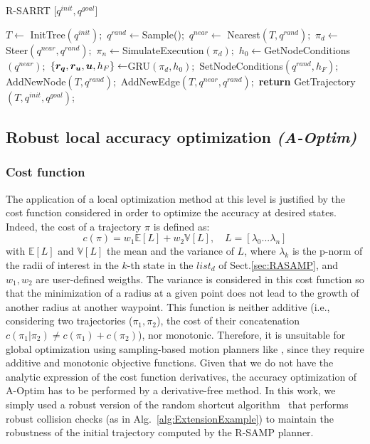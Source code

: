 \begin{algorithm}[t]
\caption{R-SARRT [$q^{init}, q^{goal}$]}\label{alg:ExtensionExample}
\begin{algorithmic}[1]
\State $T \gets$ InitTree$({q^{init}});$
\State ${q^{rand}} \gets $Sample()$;$
\State ${q^{near}} \gets$ Nearest$(T,{q^{rand}});$
\State $\pi_d \gets$ Steer$({q^{near}},{q^{rand}});$
\State $\pi_{n} \gets $SimulateExecution$(\pi_d);$
\State $h_{0} \gets $GetNodeConditions$({q^{near}});$
\State $\left \{\boldsymbol{r_q},\boldsymbol{r_u},\boldsymbol{u}, h_{F} \right \} \gets $GRU$(\pi_d,h_{0});$
        \State SetNodeConditions$({q^{rand}}, h_{F});$
        \State AddNewNode$(T, {q^{rand}});$
        \State AddNewEdge$(T, {q^{near}}, {q^{rand}});$
\EndIf
\EndWhile
\State \textbf{return} GetTrajectory$(T, q^{init}, q^{goal})$;
\end{algorithmic}
\end{algorithm}

\subsection{Robust local accuracy optimization \emph{(A-Optim)} }\label{sec:AOptim}

\subsubsection{Cost function}

The application of a local optimization method at this level is justified by the cost function considered in order to optimize the accuracy at desired states. 
Indeed, the cost of a trajectory $\pi$ is defined as:
\begin{equation}\label{eq: cost}
    c(\pi) = w_1\mathbb{E}[L] + w_2\mathbb{V}[L], \quad L = \left[\lambda_{0} ... \lambda_n \right]
\end{equation}
with $\mathbb{E}[L]$ and $\mathbb{V}[L]$ the mean and the variance of $L$, where $\lambda_k$ is the p-norm of the radii of interest in the $k$-th state in the $list_{d}$ of Sect.\ref{sec:RASAMP}, and $w_1, w_2$ are user-defined weigths.
The variance is considered in this cost function so that the minimization of a radius at a given point does not lead to the growth of another radius at another waypoint.
This function is neither additive (i.e., considering two trajectories ($\pi_{1}, \pi_{2}$), the cost of their concatenation $c(\pi_{1}|\pi_{2}) \neq c(\pi_{1}) + c(\pi_{2})$), nor monotonic. Therefore, it is unsuitable for global optimization using sampling-based motion planners like \cite{cRRT,cRRTstar}, since they require additive and monotonic objective functions.
Given that we do not have the analytic expression of the cost function derivatives, the accuracy optimization of A-Optim has to be performed by a derivative-free method. In this work, we simply used a robust version of the random shortcut algorithm~\cite{cShortcut} that performs robust collision checks (as in Alg.~\ref{alg:ExtensionExample}) to maintain the robustness of the initial trajectory computed by the R-SAMP planner.

